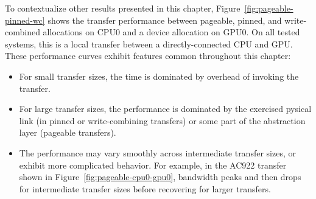 To contextualize other results presented in this chapter, Figure~\ref{fig:pageable-pinned-wc} shows the transfer performance between pageable, pinned, and write-combined allocations on CPU0 and a device allocation on GPU0.
On all tested systems, this is a local transfer between a directly-connected CPU and GPU.
These performance curves exhibit features common throughout this chapter:
\begin{itemize}
	\item For small transfer sizes, the time is dominated by overhead of invoking the transfer.
	\item For large transfer sizes, the performance is dominated by the exercised pysical link (in pinned or write-combining transfers) or some part of the abstraction layer (pageable transfers).
	\item The performance may vary smoothly across intermediate transfer sizes, or exhibit more complicated behavior.
	For example, in the AC922 transfer shown in Figure~\ref{fig:pageable-cpu0-gpu0}, bandwidth peaks and then drops for intermediate transfer sizes before recovering for larger transfers.
\end{itemize}

